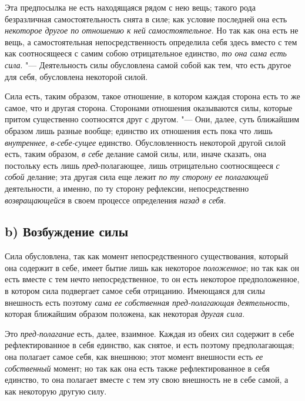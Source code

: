 Эта предпосылка не есть находящаяся рядом с нею вещь; такого рода
безразличная самостоятельность снята в силе; как условие последней она есть
{\em некоторое другое по отношению к ней
самостоятельное}. Но так как она есть не вещь, а самостоятельная
непосредственность определила себя здесь вместо с тем как соотносящееся с
самим собою отрицательное единство, {\em то она сама
есть сила}. "--- Деятельность силы обусловлена самой собой как тем, что есть
другое для себя, обусловлена некоторой силой.

Сила есть, таким образом, такое отношение, в котором каждая сторона есть то
же самое, что и другая сторона. Сторонами отношения оказываются силы,
которые притом существенно соотносятся друг с другом. "--- Они, далее, суть
ближайшим образом лишь разные вообще; единство их отношения есть пока что
лишь {\em внутреннее, в-себе-сущее} единство.
Обусловленность некоторой другой силой есть, таким образом,
{\em в себе} делание самой силы, или, иначе сказать,
она постольку есть лишь {\em пред}{}-полагающее, лишь
отрицательно соотносящееся {\em с собой} делание; эта
другая сила еще лежит {\em по ту сторону ее полагающей}
деятельности, а именно, по ту сторону рефлексии, непосредственно
{\em возвращающейся} в своем процессе определения
{\em назад в себя}.


\subsection[b) Возбуждение силы]{b) Возбуждение силы}

Сила обусловлена, так как момент
непосредственного существования, который она содержит в себе, имеет бытие
лишь как некоторое {\em положенное}; но так как он есть
вместе с тем нечто непосредственное, то он есть некоторое предположенное, в
котором сила подвергает самое себя отрицанию. Имеющаяся для силы внешность
есть поэтому {\em сама ее собственная пред-полагающая
деятельность}, которая ближайшим образом положена, как некоторая
{\em другая сила}.

Это {\em пред-полагание} есть, далее, взаимное. Каждая
из обеих сил содержит в себе рефлектированное в себя единство, как снятое,
и есть поэтому предполагающая; она полагает самое себя, как внешнюю; этот
момент внешности есть {\em ее собственный} момент; но
так как она есть также рефлектированное в себя единство, то она полагает
вместе с тем эту свою внешность не в себе самой, а как некоторую другую
силу.

